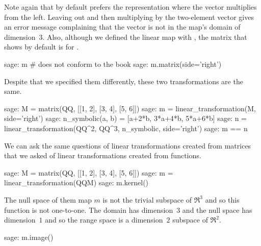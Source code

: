 Note again that by default \Sage{} prefers the 
representation where the vector multiplies
from the left.
Leaving out  and then multiplying 
by the two-element vector gives an error message
complaining that the vector is not in the map's domain
of dimension~$3$.
Also, although we defined the linear map with
, 
the matrix that \Sage{} shows by default is for 
.
\begin{sagecommandline}
sage: m     # does not conform to the book
sage: m.matrix(side='right')
\end{sagecommandline}

Despite that we specified them differently, 
these two transformations are the same.
\begin{sagecommandline}
sage: M = matrix(QQ, [[1, 2], [3, 4], [5, 6]])
sage: m = linear_transformation(M, side='right')
sage: n_symbolic(a, b) = [a+2*b, 3*a+4*b, 5*a+6*b]
sage: n = linear_transformation(QQ^2, QQ^3, n_symbolic, side='right')
sage: m == n  
\end{sagecommandline}

We can ask the same questions of linear transformations created from
matrices that we asked of linear transformations created from functions.
\begin{sagecommandline}
sage: M = matrix(QQ, [[1, 2], [3, 4], [5, 6]])
sage: m = linear_transformation(QQM)
sage: m.kernel() 
\end{sagecommandline}

The null space of them map $m$ is not the trivial subspace of $\Re^3$ 
and so this function is not one-to-one.
The domain has dimension~$3$ and the null space has dimension~$1$ 
and so the
range space is a dimension~$2$ subspace of $\Re^2$.
\begin{sagecommandline} 
sage: m.image()
\end{sagecommandline}

